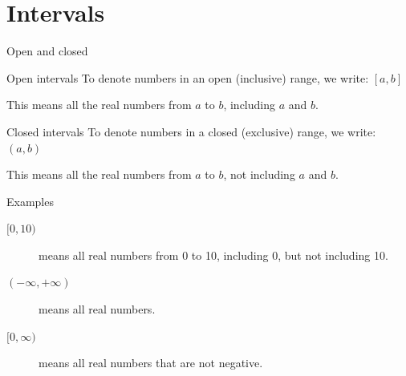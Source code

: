 	\section{Intervals}
	\begin{namedframe}{Open and closed}
		\begin{block}{Open intervals}
			To denote numbers in an open (inclusive) range, we write: $[a, b]$

			This means all the real numbers from $a$ to $b$, including $a$ and $b$.
		\end{block}
		\begin{block}{Closed intervals}
			To denote numbers in a closed (exclusive) range, we write: $(a, b)$

			This means all the real numbers from $a$ to $b$, \alert{not} including $a$ and $b$.
		\end{block}
	\end{namedframe}
	\begin{namedframe}{Examples}
		\begin{description}
			\item [$[0, 10)$] means all real numbers from 0 to 10, including 0, but not including 10.
			\item [$(-\infty, +\infty)$] means all real numbers.
			\item [$[0, \infty)$] means all real numbers that are not negative.
		\end{description}
	\end{namedframe}
